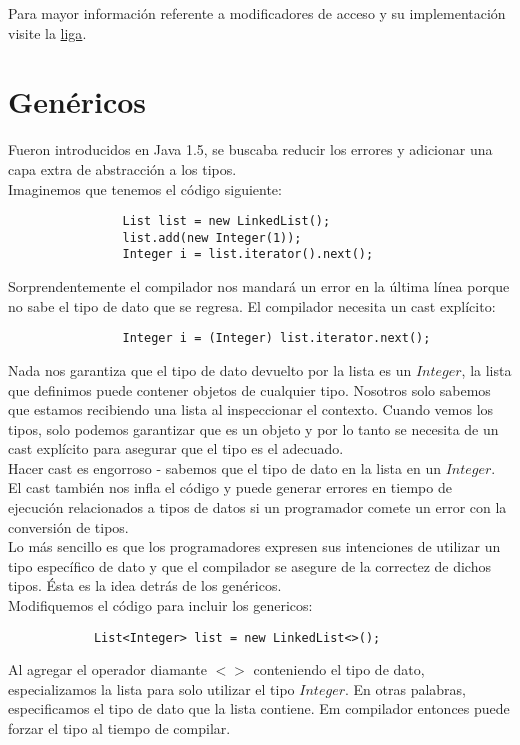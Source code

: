 \documentclass[12pt,article,oneside]{memoir}
\begin{document}
			Para mayor informaci\'on referente a modificadores de acceso y su implementaci\'on visite la 
			\href{https://www.simplilearn.com/tutorials/java-tutorial/access-modifiers#what_are_access_modifiers_in_java}{liga}.			
		\section{Gen\'ericos}
		Fueron introducidos en Java 1.5, se buscaba reducir los errores y adicionar una capa extra de abstracci\'on 
		a los tipos.\\
		
		Imaginemos que tenemos el c\'odigo siguiente:
			\begin{verbatim}
				List list = new LinkedList();
				list.add(new Integer(1)); 
				Integer i = list.iterator().next();
			\end{verbatim}
		
		Sorprendentemente el compilador nos mandar\'a un error en la \'ultima l\'inea porque no sabe el tipo de dato que 
		se regresa. El compilador necesita un cast expl\'icito:
			\begin{verbatim}
				Integer i = (Integer) list.iterator.next();
			\end{verbatim}
		
		Nada nos garantiza que el tipo de dato devuelto por la lista es un $Integer$, la lista que definimos puede contener 
		objetos de cualquier tipo. Nosotros solo sabemos que estamos recibiendo una lista al inspeccionar el contexto. Cuando 
		vemos los tipos, solo podemos garantizar que es un objeto y por lo tanto se necesita de un cast expl\'icito para 
		asegurar que el tipo es el adecuado.\\
		
		Hacer cast es engorroso - sabemos que el tipo de dato en la lista en un $Integer$. El cast tambi\'en nos infla 
		el c\'odigo y puede generar errores en tiempo de ejecuci\'on relacionados a tipos de datos si un programador 
		comete un error con la conversi\'on de tipos.\\
		
		Lo m\'as sencillo es que los programadores expresen sus intenciones de utilizar un tipo espec\'ifico de dato y que el 
		compilador se asegure de la correctez de dichos tipos. \'Esta es la idea detr\'as de los gen\'ericos.\\
		
		Modifiquemos el c\'odigo para incluir los genericos:
			\begin{verbatim}
			List<Integer> list = new LinkedList<>();
			\end{verbatim}
		Al agregar el operador diamante $<>$ conteniendo el tipo de dato, especializamos la lista para solo utilizar el tipo 
		$Integer$. En otras palabras, especificamos el tipo de dato que la lista contiene. Em compilador entonces puede 
		forzar el tipo al tiempo de compilar.\\
		
\end{document}
